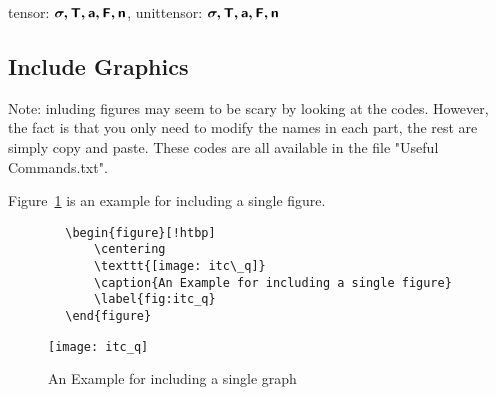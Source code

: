 tensor: $\boldsymbol{\mathsf{\sigma, T, a, F, n}}$, unittensor: $\boldsymbol{\mathsf{\sigma, T, a, F, n}}$ 

\subsection{Include Graphics}
Note: inluding figures may seem to be scary by looking at the codes. However, the fact is that you only need to modify the names in each part, the rest are simply copy and paste. These codes are all available in the file "Useful Commands.txt".

Figure~\ref{fig:itc_q} is an example for including a single figure.
\begin{center}
    \small
    \begin{verbatim}
        \begin{figure}[!htbp]
            \centering
            \texttt{[image: itc\_q]}
            \caption{An Example for including a single figure}
            \label{fig:itc_q}
        \end{figure}
    \end{verbatim}
\end{center}

\begin{figure}[!htbp]
    \centering
    \texttt{[image: itc\_q]}
    \caption{An Example for including a single graph}
    \label{fig:itc_q}
\end{figure}


